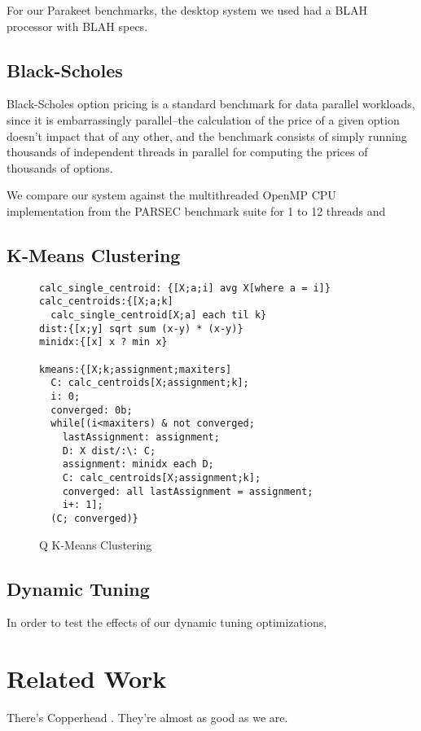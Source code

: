 \documentclass[preprint]{sigplanconf}
\begin{document}
For our Parakeet benchmarks, the desktop system we used had a BLAH processor
with BLAH specs.

\subsection{Black-Scholes}
Black-Scholes option pricing \cite{Blac73} is a standard benchmark for data
parallel workloads, since it is embarrassingly parallel--the calculation of the
price of a given option doesn't impact that of any other, and the benchmark
consists of simply running thousands of independent threads in parallel for
computing the prices of thousands of options.

We compare our system against the multithreaded OpenMP CPU implementation
from the PARSEC \cite{Bien08} benchmark suite for 1 to 12 threads and 

\subsection{K-Means Clustering}

\begin{figure}
\begin{verbatim}
calc_single_centroid: {[X;a;i] avg X[where a = i]}
calc_centroids:{[X;a;k]
  calc_single_centroid[X;a] each til k}
dist:{[x;y] sqrt sum (x-y) * (x-y)}
minidx:{[x] x ? min x}

kmeans:{[X;k;assignment;maxiters]
  C: calc_centroids[X;assignment;k];
  i: 0;
  converged: 0b;
  while[(i<maxiters) & not converged;
    lastAssignment: assignment;
    D: X dist/:\: C;
    assignment: minidx each D;
    C: calc_centroids[X;assignment;k];
    converged: all lastAssignment = assignment;
    i+: 1];
  (C; converged)}
\end{verbatim}
\caption{Q K-Means Clustering}
\label{QKMeans}
\end{figure}

\subsection{Dynamic Tuning}
In order to test the effects of our dynamic tuning optimizations, 

\section{Related Work}
\label{RelatedWork}

There's Copperhead \cite{Cata10}.  They're almost as good as we are.
\end{document}
